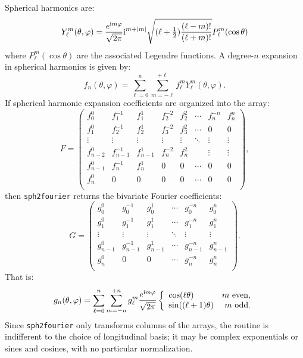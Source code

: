 \documentclass{article}
\def\ii{{\rm i}}
\begin{document}
Spherical harmonics are:
\begin{equation}
Y_\ell^m(\theta,\varphi) = \frac{e^{\ii m\varphi}}{\sqrt{2\pi}} \ii^{m+|m|}\sqrt{(\ell+\tfrac{1}{2})\frac{(\ell-m)!}{(\ell+m)!}} P_\ell^m(\cos\theta)
\end{equation}
where $P_\ell^m(\cos\theta)$ are the associated Legendre functions. A degree-$n$ expansion in spherical harmonics is given by:
\begin{equation}
f_n(\theta,\varphi) = \sum_{\ell=0}^{n}\sum_{m=-\ell}^{+\ell} f_\ell^m Y_\ell^m(\theta,\varphi).
\end{equation}
If spherical harmonic expansion coefficients are organized into the array:
\begin{equation}
F = \begin{pmatrix}
f_0^0 & f_1^{-1} & f_1^1 & f_2^{-2} & f_2^2 & \cdots & f_n^{-n} & f_n^n\\
f_1^0 & f_2^{-1} & f_2^1 & f_3^{-2} & f_3^2 & \cdots & 0 & 0\\
\vdots & \vdots & \vdots &  \vdots &  \vdots & \ddots & \vdots & \vdots\\
f_{n-2}^0 & f_{n-1}^{-1} & f_{n-1}^1 & f_n^{-2} & f_n^2 &  & \vdots & \vdots\\
f_{n-1}^0 & f_n^{-1} & f_n^1 & 0 & 0 & \cdots & 0 & 0\\
f_n^0 & 0 & 0 & 0 & 0 & \cdots & 0 & 0\\
\end{pmatrix},
\end{equation}
then {\tt sph2fourier} returns the bivariate Fourier coefficients:
\begin{equation}
G = \begin{pmatrix}
g_0^0 & g_0^{-1} & g_0^1 & \cdots & g_0^{-n} & g_0^n\\
g_1^0 & g_1^{-1} & g_1^1 & \cdots & g_1^{-n} & g_1^n\\
\vdots & \vdots & \vdots & \ddots & \vdots & \vdots\\
g_{n-1}^0 & g_{n-1}^{-1} & g_{n-1}^1& \cdots & g_{n-1}^{-n} & g_{n-1}^n\\
g_n^0 & 0 & 0 & \cdots & g_n^{-n} & g_n^n\\
\end{pmatrix}.
\end{equation}
That is:
\begin{equation}
g_n(\theta,\varphi) = \sum_{\ell=0}^n\sum_{m=-n}^{+n} g_\ell^m \frac{e^{\ii m\varphi}}{\sqrt{2\pi}} \left\{\begin{array}{lr} \cos(\ell\theta) & m~{\rm even},\\ \sin((\ell+1)\theta) & m~{\rm odd}.\end{array}\right.
\end{equation}
Since {\tt sph2fourier} only transforms columns of the arrays, the routine is indifferent to the choice of longitudinal basis; it may be complex exponentials or sines and cosines, with no particular normalization.
\end{document}
